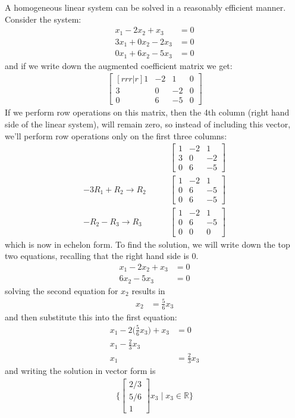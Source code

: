 A homogeneous linear system can be solved in a reasonably efficient manner.  Consider the system:
%
\begin{align*}
x_1 -2x_2 + x_3 & = 0 \\
3x_1 + 0x_2 -2x_3 & = 0 \\
0x_1 + 6x_2 -5x_3 & = 0
\end{align*}
and if we write down the augmented coefficient matrix we get:
%
\begin{align*}
\begin{bmatrix}[rrr|r]
1 & -2 & 1 & 0 \\
3 & 0 & -2 & 0 \\
0 & 6 & -5 & 0
\end{bmatrix}
\end{align*}
If we perform row operations on this matrix, then the 4th column (right hand side of the linear system), will remain zero, so instead of including this vector, we'll perform row operations only on the first three columns:
%
\begin{align*}
&\begin{bmatrix}
1 & -2 & 1 \\
3 & 0 & -2 \\
0 & 6 & -5
\end{bmatrix}\\
-3 R_1 + R_2 \rightarrow R_2 \qquad &
\begin{bmatrix}
1 & -2 & 1 \\
0 & 6 & -5 \\
0 & 6 & -5
\end{bmatrix} \\
-R_2 -R_3 \rightarrow R_3 \qquad &
\begin{bmatrix}
1 & -2 & 1 \\
0 & 6 & -5 \\
0 & 0 & 0
\end{bmatrix}
\end{align*}
which is now in echelon form.  To find the solution, we will write down the top two equations, recalling that the right hand side is 0.
%
\begin{align*}
x_1 -2x_2+x_3 & = 0 \\
6x_2-5x_3 & = 0
\end{align*}
solving the second equation for $x_2$ results in
%
\begin{align*}
x_2 & = \frac{5}{6} x_3
\end{align*}
and then substitute this into the first equation:
%
\begin{align*}
x_1 - 2\biggl(\frac{5}{6} x_3 \biggr) + x_3 & = 0 \\
x_1 -\frac{2}{3} x_3 \\
x_1 & = \frac{2}{3} x_3
\end{align*}
and writing the solution in vector form is
%
\begin{align*}
\{ \begin{bmatrix}
2/3 \\ 5/6 \\ 1
\end{bmatrix} x_3 \; | \; x_3 \in \mathbb{R} \}
\end{align*}




